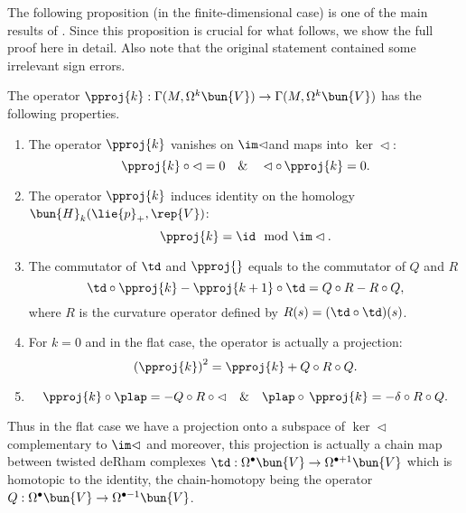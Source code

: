The following proposition (in the finite-dimensional case) is one of the main results of \cite{calderbank_differential_2001}. Since this proposition is crucial for what follows, we show the full proof here in detail. Also note that the original statement contained some irrelevant sign errors.

\begin{proposition}
 The operator $\pproj{k}: \Gamma(M,\Omega^k\bun{V}) \to \Gamma(M,\Omega^k\bun{V})$ has the following properties.
\begin{enumerate}
 \item The operator $\pproj{k}$ vanishes on $\im \lhd$and maps into $\ker \lhd$:  \[\pproj{k}\circ\lhd = 0 \quad \&\quad \lhd\circ\,\pproj{k} = 0.\]
 \item The operator $\pproj{k}$ induces identity on the homology $\bun{H}_k(\lie{p}_+,\rep{V})$:  \[\pproj{k} = \id \mod \im \lhd.\]
 \item The commutator of $\td$ and $\pproj{}$ equals to the commutator of $Q$ and $R$ \[\td \circ \pproj{k} - \pproj{k+1}\circ\td = Q\circ R - R\circ Q,\] where $R$ is the curvature operator defined by $R(s) = (\td \circ \td) (s)$.
 \item For $k=0$ and in the flat case, the operator is actually a projection: \[\left(\pproj{k}\right)^2 = \pproj{k} + Q\circ R\circ Q.\]
 \item \[\pproj{k} \circ \plap  = -Q\circ R \circ \lhd \quad \& \quad \plap \circ\, \pproj{k} = -\delta \circ R \circ Q.\]
\end{enumerate}
Thus in the flat case we have a projection onto a subspace of $\ker \lhd$ complementary to $\im \lhd$ and moreover, this projection is actually a chain map between twisted deRham complexes $\td:\Omega^\bullet\bun{V} \to \Omega^{\bullet+1}\bun{V}$ which is homotopic to the identity, the chain-homotopy being the operator $Q:\Omega^\bullet\bun{V} \to \Omega^{\bullet-1}\bun{V}$.
\end{proposition}

